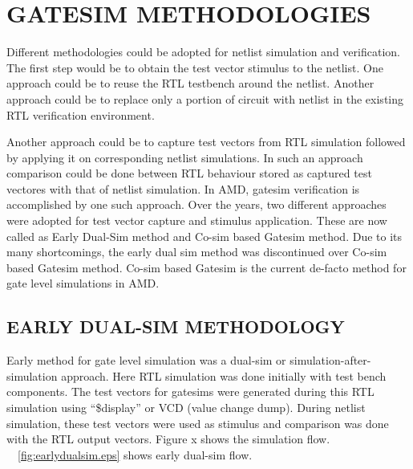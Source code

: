 \chapter{GATESIM METHODOLOGIES}
\label{chap:methodologies.tex}

Different methodologies could be adopted for netlist simulation and verification. The first step would be to obtain the test vector stimulus to the netlist. One approach could be to reuse the RTL testbench around the netlist. Another approach could be to replace only a portion of circuit with netlist in the existing RTL verification environment.

Another approach could be to capture test vectors from RTL simulation followed by applying it on corresponding netlist simulations. In such an approach comparison could be done between RTL behaviour stored as captured test vectores with that of netlist simulation.  In AMD, gatesim verification is accomplished by one such approach. Over the years, two different approaches were adopted for test vector capture and stimulus application. These are now called as Early Dual-Sim method and Co-sim based Gatesim method. Due to its many shortcomings, the early dual sim method was discontinued over Co-sim based Gatesim method. Co-sim based Gatesim is the current de-facto method for gate level simulations in AMD.


\section{EARLY DUAL-SIM METHODOLOGY}
Early method for gate level simulation was a dual-sim or simulation-after-simulation approach. Here RTL simulation was done initially with test bench components. The test vectors for gatesims were generated during this RTL simulation using ``\$display'' or VCD (value change dump). During netlist simulation, these test vectors were used as stimulus and comparison was done with the RTL output vectors. Figure x shows the simulation flow. ~\figurename{~\ref{fig:earlydualsim.eps}} shows early dual-sim flow. %

